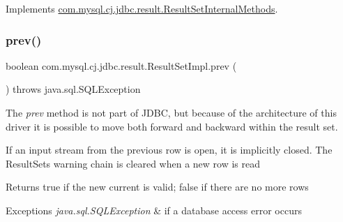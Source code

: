 Implements \mbox{\hyperlink{interfacecom_1_1mysql_1_1cj_1_1jdbc_1_1result_1_1_result_set_internal_methods_ac9b67f368406db152383d3244f7c2d08}{com.\+mysql.\+cj.\+jdbc.\+result.\+Result\+Set\+Internal\+Methods}}.

\mbox{\label{classcom_1_1mysql_1_1cj_1_1jdbc_1_1result_1_1_result_set_impl_a8ee52e92f7e5e671bf694f728936171e}} 
\subsubsection{\texorpdfstring{prev()}{prev()}}
{\footnotesize\ttfamily boolean com.\+mysql.\+cj.\+jdbc.\+result.\+Result\+Set\+Impl.\+prev (\begin{DoxyParamCaption}{ }\end{DoxyParamCaption}) throws java.\+sql.\+S\+Q\+L\+Exception}

The {\itshape prev} method is not part of J\+D\+BC, but because of the architecture of this driver it is possible to move both forward and backward within the result set.

If an input stream from the previous row is open, it is implicitly closed. The Result\+Set\textquotesingle{}s warning chain is cleared when a new row is read 

\begin{DoxyReturn}{Returns}
true if the new current is valid; false if there are no more rows
\end{DoxyReturn}

\begin{DoxyExceptions}{Exceptions}
{\em java.\+sql.\+S\+Q\+L\+Exception} & if a database access error occurs \\
\hline
\end{DoxyExceptions}
\mbox{\label{classcom_1_1mysql_1_1cj_1_1jdbc_1_1result_1_1_result_set_impl_a01b45fa8c2b4afe82d82955c8d846992}} 
